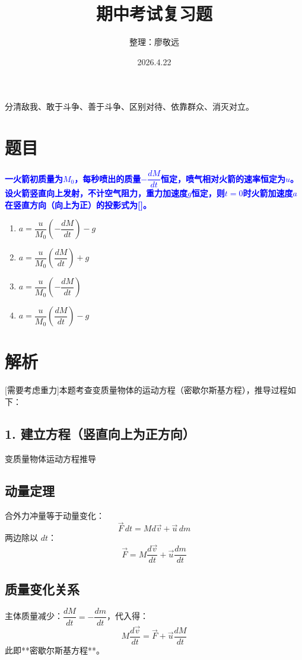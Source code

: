 \documentclass[11pt,a4paper]{article}
\begin{document}
\title{期中考试复习题}
\author{整理：廖敬远}
\date{2026.4.22}
\maketitle

分清敌我、敢于斗争、善于斗争、区别对待、依靠群众、消灭对立。

\section*{题目}
\textbf{\textcolor{blue}{一火箭初质量为$M_0$，每秒喷出的质量$-\dfrac{dM}{dt}$恒定，喷气相对火箭的速率恒定为$u$。设火箭竖直向上发射，不计空气阻力，重力加速度$g$恒定，则$t=0$时火箭加速度$a$在竖直方向（向上为正）的投影式为[\hspace{1em}]。}}

\begin{enumerate}[label=\Alph*.]
    \item $a = \dfrac{u}{M_0}\left(-\dfrac{dM}{dt}\right) - g$
    \item $a = \dfrac{u}{M_0}\left(\dfrac{dM}{dt}\right) + g$
    \item $a = \dfrac{u}{M_0}\left(-\dfrac{dM}{dt}\right)$
    \item $a = \dfrac{u}{M_0}\left(\dfrac{dM}{dt}\right) - g$
\end{enumerate}

\section*{解析}
[需要考虑重力]本题考查变质量物体的运动方程（密歇尔斯基方程），推导过程如下：

\subsection*{1. 建立方程（竖直向上为正方向）}

变质量物体运动方程推导

\subsection*{动量定理}
合外力冲量等于动量变化：
\[
\vec{F}\,dt = M d\vec{v} + \vec{u}\,dm
\]
两边除以 $dt$：
\[
\vec{F}
= M\frac{d\vec{v}}{dt}
+ \vec{u}\frac{dm}{dt}
\]

\subsection*{ 质量变化关系}
主体质量减少：$\dfrac{dM}{dt}=-\dfrac{dm}{dt}$，代入得：
\[
\boxed{
M\frac{d\vec{v}}{dt}
= \vec{F}
+ \vec{u}\frac{dM}{dt}
}
\]
此即**密歇尔斯基方程**。
\end{document}
